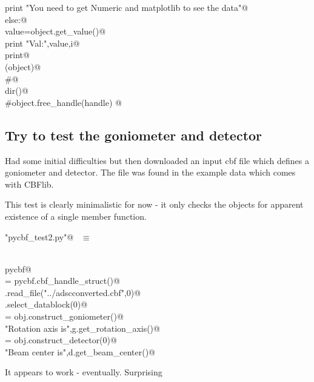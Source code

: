 \documentclass[10pt,a4paper,twoside,notitlepage]{article}
\begin{document}
\begin{flushleft}
\begin{list}{}{}
\mbox{}\verb@                   print "You need to get Numeric and matplotlib to see the data"@\\
\mbox{}\verb@            else:@\\
\mbox{}\verb@                value=object.get_value()@\\
\mbox{}\verb@                print "Val:",value,i@\\
\mbox{}\verb@    print@\\
\mbox{}\verb@del(object)@\\
\mbox{}\verb@#@\\
\mbox{}\verb@print dir()@\\
\mbox{}\verb@#object.free_handle(handle) @\\
\mbox{}\verb@@{\NWsep}
\end{list}
\vspace{-2ex}
\end{flushleft}
\subsection{Try to test the goniometer and detector}

Had some initial difficulties but then downloaded an input cbf file which defines 
a goniometer and detector. 
The file was found in the example data which comes with CBFlib.

This test is clearly minimalistic for now - it only checks the objects 
for apparent existence of
a single member function.

\begin{flushleft} \small \label{scrap18}
\verb@"pycbf_test2.py"@\nobreak\ {\footnotesize {} }$\equiv$
\vspace{-1ex}
\begin{list}{}{} \item
\mbox{}\verb@@\\
\mbox{}\verb@import pycbf@\\
\mbox{}\verb@obj = pycbf.cbf_handle_struct()@\\
\mbox{}\verb@obj.read_file("../adscconverted.cbf",0)@\\
\mbox{}\verb@obj.select_datablock(0)@\\
\mbox{}\verb@g = obj.construct_goniometer()@\\
\mbox{}\verb@print "Rotation axis is",g.get_rotation_axis()@\\
\mbox{}\verb@d = obj.construct_detector(0)@\\
\mbox{}\verb@print "Beam center is",d.get_beam_center()@\\
\mbox{}\verb@@{\NWsep}
\end{list}
\vspace{-2ex}
\end{flushleft}
It appears to work - eventually. Surprising
\end{document}
